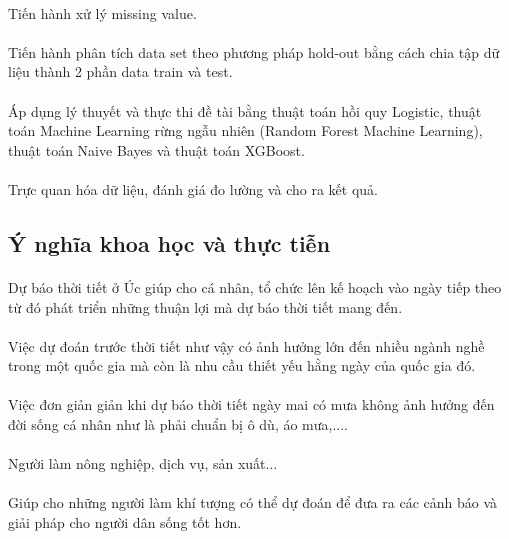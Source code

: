 \documentclass{article}
\begin{document}
\paragraph{}Tiến hành xử lý missing value.
\paragraph{}Tiến hành phân tích data set theo phương pháp hold-out bằng cách chia tập dữ liệu thành 2 phần data train và test.
\paragraph{} Áp dụng lý thuyết và thực thi đề tài bằng thuật toán hồi quy Logistic, thuật toán Machine Learning rừng ngẫu nhiên (Random Forest Machine Learning), thuật toán Naive Bayes và thuật toán XGBoost.
\paragraph{} Trực quan hóa dữ liệu, đánh giá đo lường và cho ra kết quả.

\subsection{Ý nghĩa khoa học và thực tiễn}
  \paragraph{}Dự báo thời tiết ở Úc giúp cho cá nhân, tổ chức lên kế hoạch vào ngày tiếp theo từ đó phát triển những thuận lợi mà dự báo thời tiết mang đến. 
  \paragraph{}  
  Việc dự đoán trước thời tiết như vậy có ảnh hưởng lớn đến nhiều ngành nghề trong một quốc gia mà còn là nhu cầu thiết yếu hằng ngày của quốc gia đó.
  \paragraph{}
  Việc đơn giản giản khi dự báo thời tiết ngày mai có mưa không ảnh hưởng đến đời sống cá nhân như là phải chuẩn bị ô dù, áo mưa,....
   \paragraph{} Người làm nông nghiệp, dịch vụ, sản xuất...
   \paragraph{}Giúp cho những người làm khí tượng có thể dự đoán để đưa ra các cảnh báo và giải pháp cho người dân sống tốt hơn.
\pagebreak
\end{document}

